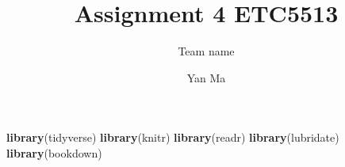\documentclass[
]{article}
\title{Assignment 4 ETC5513}
\subtitle{Team name}
\author{Yan Ma}
\date{}
\newenvironment{Shaded}{\begin{snugshade}}{\end{snugshade}}
\newcommand{\DataTypeTok}[1]{\textcolor[rgb]{0.13,0.29,0.53}{#1}}
\newcommand{\KeywordTok}[1]{\textcolor[rgb]{0.13,0.29,0.53}{\textbf{#1}}}
\newcommand{\NormalTok}[1]{#1}
\newcommand{\OperatorTok}[1]{\textcolor[rgb]{0.81,0.36,0.00}{\textbf{#1}}}
\newcommand{\OtherTok}[1]{\textcolor[rgb]{0.56,0.35,0.01}{#1}}
\begin{document}
\maketitle

{
\setcounter{tocdepth}{2}
\tableofcontents
}
\begin{Shaded}
\end{Shaded}

\begin{Shaded}
\begin{Highlighting}[]
\KeywordTok{library}\NormalTok{(tidyverse)}
\KeywordTok{library}\NormalTok{(knitr)}
\KeywordTok{library}\NormalTok{(readr)}
\KeywordTok{library}\NormalTok{(lubridate)}
\KeywordTok{library}\NormalTok{(bookdown)}
\end{Highlighting}
\end{Shaded}
\end{document}
